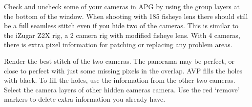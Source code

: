 \begin{fullwidth}
Check and uncheck some of your cameras in APG by using the group layers at the bottom of the window. When shooting with 185 fisheye lens there should still be a full seamless stitch even if you hide two of the cameras.  This is similar to the iZugar Z2X rig, a 2 camera rig with modified fisheye lens. With 4 cameras, there is extra pixel information for patching or replacing any problem areas. 


Render the best stitch of the two cameras. The panorama may be perfect, or close to perfect with just some missing pixels in the overlap. AVP fills the holes with black. To fill the holes, use the information from the other two cameras. Select the camera layers of other hidden cameras camera. Use the red ‘remove’ markers to delete extra information you already have.


\clearpage
\end{fullwidth}